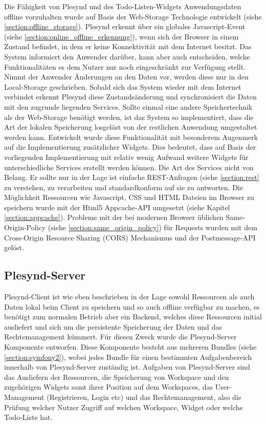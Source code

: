 Die Fähigkeit von Plesynd und des Todo-Listen-Widgets Anwendungsdaten offline vorzuhalten wurde auf Basis der Web-Storage Technologie entwickelt (siehe \ref{section:offline_storage}). Plesynd erkennt über ein globales Javascript-Event (siehe \ref{section:online_offline_erkennung}), wenn sich der Browser in einem Zustand befindet, in dem er keine Konnektivität mit dem Internet besitzt. Das System informiert den Anwender darüber, kann aber auch entscheiden, welche Funktionalitäten es dem Nutzer nur noch eingeschränkt zur Verfügung stellt. Nimmt der Anwender Änderungen an den Daten vor, werden diese nur in den Local-Storage geschrieben. Sobald sich das System wieder mit dem Internet verbindet erkennt Plesynd diese Zustandsänderung und synchronisiert die Daten mit den zugrunde liegenden Services. Sollte einmal eine andere Speichertechnik als der Web-Storage benötigt werden, ist das System so implementiert, dass die Art der lokalen Speicherung losgelöst von der restlichen Anwendung umgestaltet werden kann. Entwickelt wurde diese Funktionalität mit besonderem Augenmerk auf die Implementierung zusätzlicher Widgets. Dies bedeutet, dass auf Basis der vorliegenden Implementierung mit relativ wenig Aufwand weitere Widgets für unterschiedliche Services erstellt werden können. Die Art des Services nicht von Belang. Er sollte nur in der Lage ist einfache REST-Anfragen (siehe \ref{section:rest} zu verstehen, zu verarbeiten und standardkonform auf sie zu antworten. Die Möglichkeit Ressourcen wie Javascript, CSS und HTML Dateien im Browser zu speichern wurde mit der Html5 Appcache-API umgesetzt (siehe Kapitel \ref{section:appcache}). Probleme mit der bei modernen Browser üblichen Same-Origin-Policy (siehe \ref{section:same_origin_policy}) für Requests wurden mit dem Cross-Origin Resource Sharing (CORS) Mechanismus und der Postmessage-API gelöst. 

\subsection{Plesynd-Server}
Plesynd-Client ist wie eben beschrieben in der Lage sowohl Ressourcen als auch Daten lokal beim Client zu speichern und so auch offline verfügbar zu machen, es benötigt zum normalen Betrieb aber ein Backend, welches diese Ressourcen initial ausliefert und sich um die persistente Speicherung der Daten und das Rechtemanagement kümmert. Für diesen Zweck wurde die Plesynd-Server Komponente entworfen. Diese Komponente besteht aus mehreren Bundles (siehe \ref{section:symfony2}), wobei jedes Bundle für einen bestimmten Aufgabenbereich innerhalb  von Plesynd-Server zuständig ist. Aufgaben von Plesynd-Server sind das Ausliefern der Ressourcen, die Speicherung von Workspace und den zugehörigen Widgets samt ihrer Position auf dem Workspaces, das User-Management (Registrieren, Login etc) und das Rechtemanagement, also die Prüfung welcher Nutzer Zugriff auf welchen Workspace, Widget oder welche Todo-Liste hat. 

